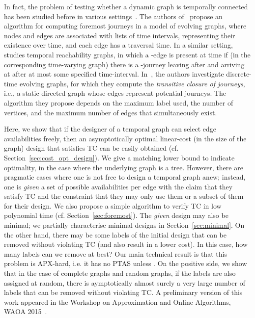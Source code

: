 \documentclass[a4paper,UKenglish]{article}
\begin{document}
In fact, the problem of testing whether a dynamic graph is temporally connected has been studied before in various settings~\cite{xuan,whitbeck,barjon}. The authors of~\cite{xuan} propose an algorithm for computing foremost journeys in a model of evolving graphs, where nodes and edges are associated with lists of time intervals, representing their existence over time, and each edge has a traversal time. In a similar setting,~\cite{whitbeck} studies temporal reachability graphs, in which a -edge is present at time  if (in the corresponding time-varying graph) there is a -journey leaving  after  and arriving at  after at most some specified time-interval. In~\cite{barjon}, the authors investigate discrete-time evolving graphs, for which they compute the \emph{transitive closure of journeys}, i.e., a static directed graph whose edges represent potential journeys. The algorithm they propose depends on the maximum label used, the number of vertices, and the maximum number of edges that simultaneously exist.

Here, we show that if the designer of a temporal graph can select edge availabilities freely, then an asymptotically optimal linear-cost (in the size of the graph) design that satisfies TC can be easily obtained (cf. Section~\ref{sec:cost_opt_design}). We give a matching lower bound to indicate optimality, in the case where the underlying graph is a tree. However, there are pragmatic cases where one is not free to design a temporal graph anew; instead, one is \emph{given} a set of possible availabilities per edge with the claim that they satisfy TC and the constraint that they may only use them or a subset of them for their design. We also propose a simple algorithm to verify TC in low polynomial time (cf. Section~\ref{sec:foremost}). The \emph{given} design may also be minimal; we partially characterise minimal designs in Section~\ref{sec:minimal}. On the other hand, there may be some labels of the initial design that can be removed without violating TC (and also result in a lower cost). In this case, how many labels can we remove at best? Our main technical result is that this problem is APX-hard, i.e. it has no PTAS unless . On the positive side, we show that in the case of complete graphs and random graphs, if the labels are also assigned at random, there is aymptotically almost surely a very large number of labels that can be removed without violating TC. A preliminary version of this work appeared in the  Workshop on Approximation and Online Algorithms, WAOA 2015~\cite{akrida-waoa}.
\end{document}
